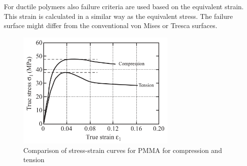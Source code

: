 For ductile polymers also failure criteria are used based on the equivalent strain. This strain is calculated in a similar way as the equivalent stress. The failure surface might differ from the conventional von Mises or Tresca surfaces. 
\begin{figure}[htb]
    \centering
    \includegraphics[width=0.7\textwidth]{chapter_2/figures/SStensioncompression.png}
    \caption{Comparison of stress-strain curves for PMMA for compression and tension \cite{Halary2011PolymerMaterials}}
    \label{fig:SStensioncompression}
\end{figure}

